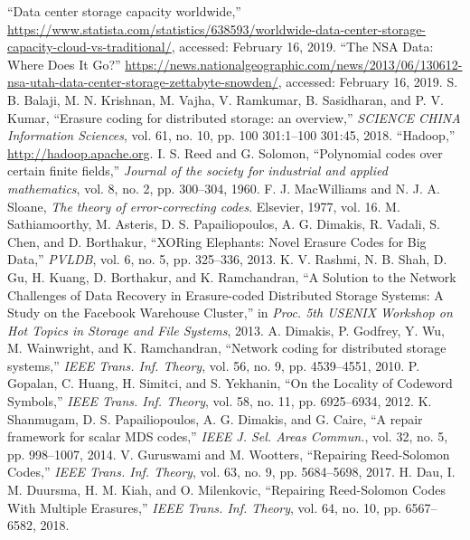 \begin{multicols}{2}
\begin{thebibliography}{99}
 ``Data center storage capacity worldwide,'' \url{https://www.statista.com/statistics/638593/worldwide-data-center-storage-capacity-cloud-vs-traditional/}, accessed: February 16, 2019. 
 ``The NSA Data: Where Does It Go?'' \url{https://news.nationalgeographic.com/news/2013/06/130612-nsa-utah-data-center-storage-zettabyte-snowden/}, accessed: February 16, 2019.
 S. B. Balaji, M. N. Krishnan, M. Vajha, V. Ramkumar, B. Sasidharan, and P. V. Kumar, ``Erasure coding for distributed storage: an overview,'' \textit{SCIENCE CHINA Information Sciences}, vol. 61, no. 10, pp. 100 301:1--100 301:45, 2018.
 ``Hadoop,'' \url{http://hadoop.apache.org}.
 I. S. Reed and G. Solomon, ``Polynomial codes over certain finite fields,'' \textit{Journal of the society for industrial and applied mathematics}, vol. 8, no. 2, pp. 300--304, 1960.
 F. J. MacWilliams and N. J. A. Sloane, \textit{The theory of error-correcting codes}. Elsevier, 1977, vol. 16.
 M. Sathiamoorthy, M. Asteris, D. S. Papailiopoulos, A. G. Dimakis, R. Vadali, S. Chen, and D. Borthakur, ``XORing Elephants: Novel Erasure Codes for Big Data,'' \textit{PVLDB}, vol. 6, no. 5, pp. 325--336, 2013.
 K. V. Rashmi, N. B. Shah, D. Gu, H. Kuang, D. Borthakur, and K. Ramchandran, ``A Solution to the Network Challenges of Data Recovery in Erasure-coded Distributed Storage Systems: A Study on the Facebook Warehouse Cluster,'' in \textit{Proc. 5th USENIX Workshop on Hot Topics in Storage and File Systems}, 2013.
 A. Dimakis, P. Godfrey, Y. Wu, M. Wainwright, and K. Ramchandran, ``Network coding for distributed storage systems,'' \textit{IEEE Trans. Inf. Theory}, vol. 56, no. 9, pp. 4539--4551, 2010.
 P. Gopalan, C. Huang, H. Simitci, and S. Yekhanin, ``On the Locality of Codeword Symbols,''  \textit{IEEE Trans. Inf. Theory}, vol. 58, no. 11, pp. 6925--6934, 2012.
 K. Shanmugam, D. S. Papailiopoulos, A. G. Dimakis, and G. Caire, ``A repair framework for scalar MDS codes,'' \textit{IEEE J. Sel. Areas Commun.}, vol. 32, no. 5, pp. 998--1007, 2014.
 V. Guruswami and M. Wootters, ``Repairing Reed-Solomon Codes,'' \textit{IEEE Trans. Inf. Theory}, vol. 63, no. 9, pp. 5684--5698, 2017.
 H. Dau, I. M. Duursma, H. M. Kiah, and O. Milenkovic, ``Repairing Reed-Solomon Codes With Multiple Erasures,'' \textit{IEEE Trans. Inf. Theory}, vol. 64, no. 10, pp. 6567--6582, 2018.

\end{thebibliography}
\end{multicols}
